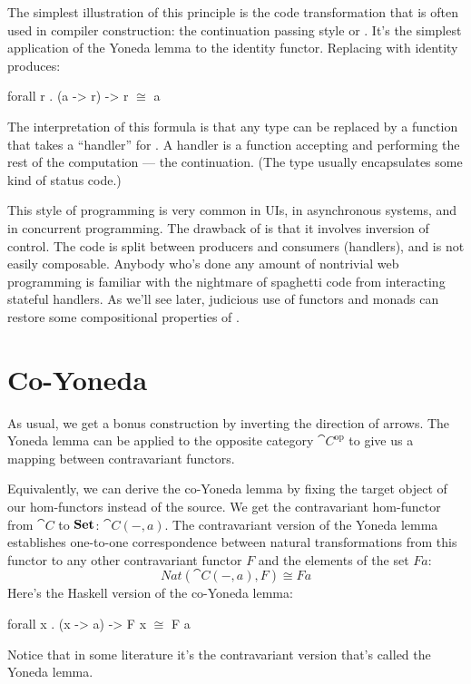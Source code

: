 The simplest illustration of this principle is the code transformation
that is often used in compiler construction: the continuation passing
style or . It's the simplest application of the Yoneda lemma to the
identity functor. Replacing  with identity produces:

\begin{snipv}
forall r . (a -> r) -> r \ensuremath{\cong} a
\end{snipv}
The interpretation of this formula is that any type  can be
replaced by a function that takes a ``handler'' for . A
handler is a function accepting  and performing the rest of
the computation --- the continuation. (The type  usually
encapsulates some kind of status code.)

This style of programming is very common in UIs, in asynchronous
systems, and in concurrent programming. The drawback of  is that it
involves inversion of control. The code is split between producers and
consumers (handlers), and is not easily composable. Anybody who's done
any amount of nontrivial web programming is familiar with the nightmare
of spaghetti code from interacting stateful handlers. As we'll see
later, judicious use of functors and monads can restore some
compositional properties of .

\section{Co-Yoneda}

As usual, we get a bonus construction by inverting the direction of
arrows. The Yoneda lemma can be applied to the opposite category
$\cat{C}^{\mathrm{op}}$ to give us a mapping between contravariant
functors.

Equivalently, we can derive the co-Yoneda lemma by fixing the target
object of our hom-functors instead of the source. We get the
contravariant hom-functor from $\cat{C}$ to $\mathbf{Set}$:
$\cat{C}(-, a)$. The contravariant version of the Yoneda lemma
establishes one-to-one correspondence between natural transformations
from this functor to any other contravariant functor $F$ and the
elements of the set $F a$:
\[\mathit{Nat}(\cat{C}(-, a), F) \cong F a\]
Here's the Haskell version of the co-Yoneda lemma:

\begin{snipv}
forall x . (x -> a) -> F x \ensuremath{\cong} F a
\end{snipv}
Notice that in some literature it's the contravariant version that's
called the Yoneda lemma.

